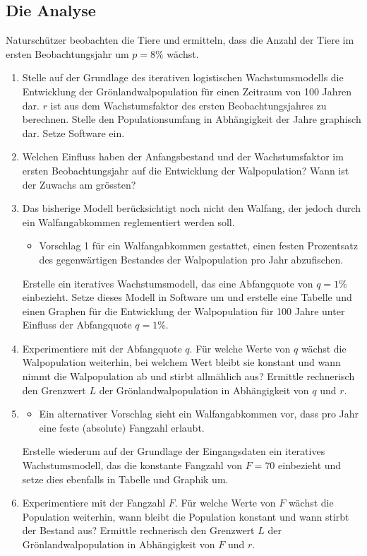 \documentclass[%
11pt,%
twoside,%
titlepage,%
german,%
headsepline%
]{scrartcl}
\begin{document}
\subsection{Die Analyse}
Naturschützer beobachten die Tiere und ermitteln, dass die Anzahl der Tiere im ersten Beobachtungsjahr um $p=8\%$ wächst.
\begin{enumerate}
\item Stelle auf der Grundlage des iterativen logistischen Wachstumsmodells die Entwicklung der Grönlandwalpopulation für einen Zeitraum von 100 Jahren dar. $r$ ist aus dem Wachstumsfaktor des ersten Beobachtungsjahres zu berechnen. Stelle den Populationsumfang in Abhängigkeit der Jahre graphisch dar. Setze Software ein.
\item Welchen Einfluss haben der Anfangsbestand und der Wachstumsfaktor im ersten Beobachtungsjahr auf die Entwicklung der Walpopulation? Wann ist der Zuwachs am grössten?
\item Das bisherige Modell berücksichtigt noch nicht den Walfang, der jedoch durch ein Walfangabkommen reglementiert werden soll.
\begin{itemize}
\item Vorschlag 1 für ein Walfangabkommen gestattet, einen festen Prozentsatz des gegenwärtigen Bestandes der Walpopulation pro Jahr abzufischen.
\end{itemize}
Erstelle ein iteratives Wachstumsmodell, das eine Abfangquote von $q=1\%$ einbezieht. Setze dieses Modell in Software um und erstelle eine Tabelle und einen Graphen für die Entwicklung der Walpopulation für 100 Jahre unter Einfluss der Abfangquote $q=1\%$.
\item Experimentiere mit der Abfangquote $q$. Für welche Werte von $q$ wächst die Walpopulation weiterhin, bei welchem Wert bleibt sie konstant und wann nimmt die Walpopulation ab und stirbt allmählich aus? Ermittle rechnerisch den Grenzwert $L$ der Grönlandwalpopulation in Abhängigkeit von $q$ und $r$.
\item 
\begin{itemize}
\item Ein alternativer Vorschlag sieht ein Walfangabkommen vor, dass pro Jahr eine feste (absolute) Fangzahl erlaubt.
\end{itemize}
Erstelle wiederum auf der Grundlage der Eingangsdaten ein iteratives Wachstumsmodell, das die konstante Fangzahl von $F=70$ einbezieht und setze dies ebenfalls in Tabelle und Graphik um.
\item Experimentiere mit der Fangzahl $F$. Für welche Werte von $F$ wächst die Population weiterhin, wann bleibt die Population konstant und wann stirbt der Bestand aus? Ermittle rechnerisch den Grenzwert $L$ der Grönlandwalpopulation in Abhängigkeit von $F$ und $r$.

\end{enumerate}
\end{document}
